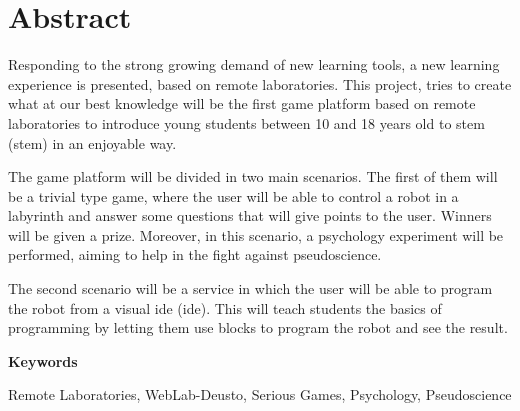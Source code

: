 \chapter*{Abstract}

Responding to the strong growing demand of new learning tools, a new learning experience is
presented, based on remote laboratories. This project, tries to create what at our best knowledge
will be the first game platform based on remote laboratories to introduce young students between 10
and 18 years old to \acrshort{stem} (\acrlong{stem}) in an enjoyable way.

The game platform will be divided in two main scenarios. The first of them will be a trivial type
game, where the user will be able to control a robot in a labyrinth and answer some questions that
will give points to the user. Winners will be given a prize. Moreover, in this scenario, a
psychology experiment will be performed, aiming to help in the fight against pseudoscience.

The second scenario will be a service in which the user will be able to program the robot from a
visual \acrshort{ide} (\acrlong{ide}). This will teach students the basics of programming by letting
them use blocks to program the robot and see the result.

\vspace{2em}

{\Large\bfseries\sffamily Keywords}
\vspace{3\medskipamount}

Remote Laboratories, WebLab-Deusto, Serious Games, Psychology, Pseudoscience

